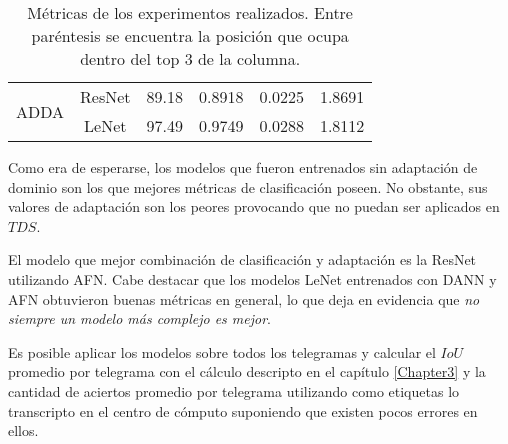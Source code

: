 \begin{table}[H]
\begin{tabular}{cc|rrrr}
        \multirow[c]{2}{*}{ADDA} & ResNet & 89.18                              & 0.8918                              & 0.0225                              & 1.8691                              \\
                                 & LeNet  & 97.49                              & 0.9749                              & 0.0288                              & 1.8112                              \\
        \bottomrule
    \end{tabular}
    \caption{M\'etricas de los experimentos realizados. Entre par\'entesis se encuentra la posici\'on que ocupa dentro del top 3 de la columna.}
    \label{tab:metricas-experimentos}
\end{table}

Como era de esperarse, los modelos que fueron entrenados sin adaptaci\'on de dominio son los que mejores m\'etricas de
clasificaci\'on poseen. No obstante, sus valores de adaptaci\'on son los peores provocando que no puedan ser aplicados
en $TDS$.

El modelo que mejor combinaci\'on de clasificaci\'on y adaptaci\'on es la ResNet utilizando AFN. Cabe destacar que los
modelos LeNet entrenados con DANN y AFN obtuvieron buenas m\'etricas en general, lo que deja en evidencia que {\it no
        siempre un modelo m\'as complejo es mejor}.

Es posible aplicar los modelos sobre todos los telegramas y calcular el $IoU$ promedio por telegrama con el c\'alculo
descripto en el cap\'itulo \ref{Chapter3} y la cantidad de aciertos promedio por telegrama utilizando como etiquetas lo
transcripto en el centro de c\'omputo suponiendo que existen pocos errores en ellos.

